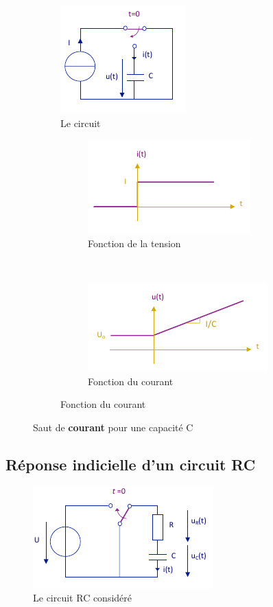 \documentclass[12pt,a4paper]{article}
\begin{document}
\begin{figure}[!h]
	\centering
	\begin{subfigure}[c]{0.45\textwidth}
		\centering
		\includegraphics[scale=0.75]{images/saut_courant_C}
		\caption{Le circuit}
	\end{subfigure}
	\begin{subfigure}[c]{0.45\textwidth}	
		\begin{subfigure}[c]{0.9\textwidth}
			\centering
			\includegraphics[scale=0.7]{images/fonction1_saut_courant_C}
			\caption{Fonction de la tension}
		\end{subfigure}\\
		\begin{subfigure}[c]{0.9\textwidth}
			\centering
			\includegraphics[scale=0.7]{images/fonction2_saut_courant_C}
			\caption{Fonction du courant}
		\end{subfigure}	
	\end{subfigure}
	\caption{Saut de \textbf{courant} pour une capacité C}
\end{figure}

\subsection[Circuit RC]{Réponse indicielle d'un circuit RC}
\label{subsubsection: reponse indicielle - RC}
\begin{figure}
	\centering
	\includegraphics[scale=0.75]{images/circuit_RC_saut}
	\caption{Le circuit RC considéré}
	\label{fig: circuit RC saut}
\end{figure}
\end{document}
